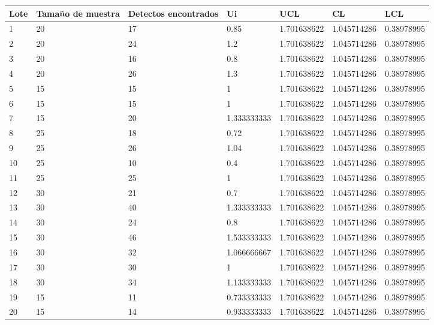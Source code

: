 \documentclass{article}
\theoremstyle{mytheoremstyle}
\theoremstyle{mytheoremstyle}
\theoremstyle{myproblemstyle}
\begin{document}
\begin{table}[!ht]
    \centering
    \begin{tabular}{|l|l|l|l|l|l|l|}
    \hline
        Lote & Tamaño de muestra & Detectos encontrados & Ui & UCL & CL & LCL \\ \hline
        1 & 20 & 17 & 0.85 & 1.701638622 & 1.045714286 & 0.38978995 \\ \hline
        2 & 20 & 24 & 1.2 & 1.701638622 & 1.045714286 & 0.38978995 \\ \hline
        3 & 20 & 16 & 0.8 & 1.701638622 & 1.045714286 & 0.38978995 \\ \hline
        4 & 20 & 26 & 1.3 & 1.701638622 & 1.045714286 & 0.38978995 \\ \hline
        5 & 15 & 15 & 1 & 1.701638622 & 1.045714286 & 0.38978995 \\ \hline
        6 & 15 & 15 & 1 & 1.701638622 & 1.045714286 & 0.38978995 \\ \hline
        7 & 15 & 20 & 1.333333333 & 1.701638622 & 1.045714286 & 0.38978995 \\ \hline
        8 & 25 & 18 & 0.72 & 1.701638622 & 1.045714286 & 0.38978995 \\ \hline
        9 & 25 & 26 & 1.04 & 1.701638622 & 1.045714286 & 0.38978995 \\ \hline
        10 & 25 & 10 & 0.4 & 1.701638622 & 1.045714286 & 0.38978995 \\ \hline
        11 & 25 & 25 & 1 & 1.701638622 & 1.045714286 & 0.38978995 \\ \hline
        12 & 30 & 21 & 0.7 & 1.701638622 & 1.045714286 & 0.38978995 \\ \hline
        13 & 30 & 40 & 1.333333333 & 1.701638622 & 1.045714286 & 0.38978995 \\ \hline
        14 & 30 & 24 & 0.8 & 1.701638622 & 1.045714286 & 0.38978995 \\ \hline
        15 & 30 & 46 & 1.533333333 & 1.701638622 & 1.045714286 & 0.38978995 \\ \hline
        16 & 30 & 32 & 1.066666667 & 1.701638622 & 1.045714286 & 0.38978995 \\ \hline
        17 & 30 & 30 & 1 & 1.701638622 & 1.045714286 & 0.38978995 \\ \hline
        18 & 30 & 34 & 1.133333333 & 1.701638622 & 1.045714286 & 0.38978995 \\ \hline
        19 & 15 & 11 & 0.733333333 & 1.701638622 & 1.045714286 & 0.38978995 \\ \hline
        20 & 15 & 14 & 0.933333333 & 1.701638622 & 1.045714286 & 0.38978995 \\ \hline

\end{tabular}
\end{table}
\end{document}
